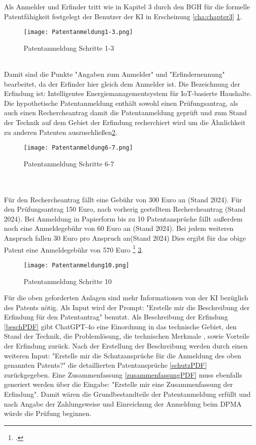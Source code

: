 Als Anmelder und Erfinder tritt 
wie in Kapitel 3 durch den BGH für die formelle 
Patentfähigkeit festgelegt der Benutzer
der KI in Erscheinung \ref{cha:chapter3} \ref{fig:Pat1-3}.
\begin{figure}[htb]
    \centering
    \texttt{[image: Patentanmeldung1-3.png]}\\
    \caption{ Patentanmeldung Schritte 1-3 }\label{fig:Pat1-3}
\end{figure}
\\
Damit sind die Punkte "Angaben zum Anmelder" und "Erfindernennung" bearbeitet, 
da der Erfinder hier gleich dem Anmelder ist.
Die Bezeichnung der Erfindung ist:
Intelligentes Energiemanagementsystem für IoT-basierte Haushalte.
Die hypothetische Patentanmeldung enthält sowohl einen Prüfungsantrag, 
als auch einen Rechercheantrag damit die Patentanmeldung
geprüft und zum Stand der Technik auf dem Gebiet 
der Erfindung recherchiert wird um die Ähnlichkeit
zu anderen Patenten auszuschließen\ref{fig:Pat6-7}.
\begin{figure}[htb]
    \centering
    \texttt{[image: Patentanmeldung6-7.png]}\\
    \caption{ Patentanmeldung Schritte 6-7 }\label{fig:Pat6-7}
\end{figure}
\\
\\
Für den Rechercheantrag fällt eine Gebühr von 300 Euro an (Stand 2024).
Für den Prüfungsantrag 150 Euro, nach vorherig gestelltem Rechercheantrag (Stand 2024).
Bei Anmeldung in Papierform bis zu 10 Patentansprüche fällt außerdem noch eine
Anmeldegebühr von 60 Euro an (Stand 2024). Bei jedem weiteren Anspruch
fallen 30 Euro pro Anspruch an(Stand 2024) Dies ergibt für das obige Patent 
eine Anmeldegebühr von 570 Euro \footcite{DPMAPatente} \ref{fig:Pat10}.
\begin{figure}[htb]
    \centering
    \texttt{[image: Patentanmeldung10.png]}\\
    \caption{ Patentanmeldung Schritte 10 }\label{fig:Pat10}
\end{figure}

Für die oben geforderten Anlagen sind mehr Informationen von der KI
bezüglich des Patents nötig.
Als Input wird der Prompt:
"Erstelle mir die Beschreibung der Erfindung für den Patentantrag" benutzt.
Als Beschreibung der Erfindung \ref{beschPDF} gibt ChatGPT-4o eine Einordnung 
in das technische Gebiet, den Stand der Technik, die Problemlösung,
die technischen Merkmale , sowie Vorteile der Erfindung zurück.
Nach der Erstellung der Beschreibung werden durch einen weiteren Input:
"Erstelle mir die Schutzansprüche für die Anmeldung des oben genannten Patents?"
die detaillierten Patentansprüche \ref{schutzPDF} 
zurückgegeben.
Eine Zusammenfassung \ref{zusammenfassungPDF} muss ebenfalls
generiert werden über die Eingabe:
"Erstelle mir eine Zusammenfassung der Erfindung". 
Damit wären die Grundbestandteile der Patentanmeldung erfüllt und nach Angabe der 
Zahlungsweise und
Einreichung der Anmeldung beim DPMA würde die Prüfung beginnen. 

